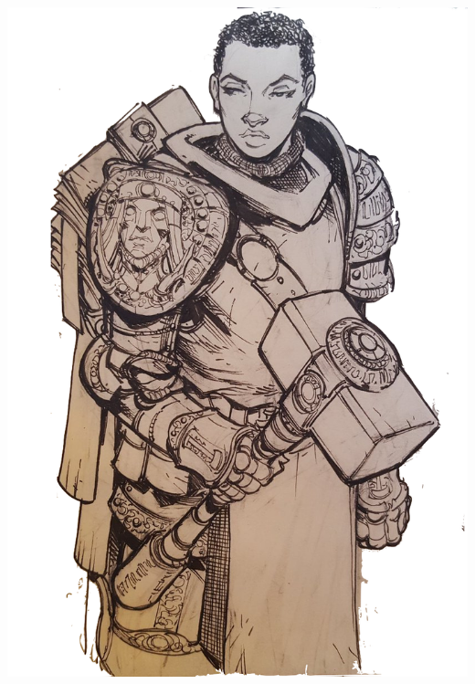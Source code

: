 \begin{multicols*}{2}
\begin{Figure}
\centering
\includegraphics[width=\textwidth]{img/paladin-2.png}
\end{Figure}
    
\end{multicols*}

    